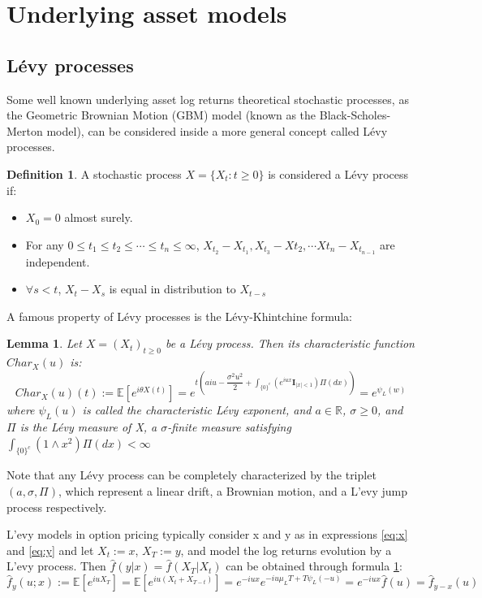 \documentclass[12,twoside]{mammeTFM}
\newtheorem{lem}[thm]{Lemma}
\theoremstyle{definition}
\newtheorem{definition}[thm]{Definition}
\theoremstyle{remark}
\newcommand{\E}{\ensuremath{\mathbb{E}}}
\newcommand{\R}{\ensuremath{\mathbb{R}}}
\begin{document}
\section{Underlying asset models}
\subsection{L\'evy processes}\label{chapter:levy}
Some well known underlying asset log returns theoretical stochastic processes, as the Geometric Brownian Motion (GBM) model (known as the Black-Scholes-Merton\cite{bs73, mer73} model), can be considered inside a more general concept called L\'evy processes.

\begin{definition} A stochastic process $X = \{X_t : t \geq 0\}$ is considered a L\'evy process if:
\begin{itemize}
\item $X_0 = 0$ almost surely.
\item For any $0 \leq t_1 \leq t_2 \leq \cdots \leq t_n \leq \infty$, $X_{t_2} - X_{t_1}, X_{t_3} - X{t_2}, \cdots X{t_n} - X_{t_{n-1}}$ are independent.
\item $\forall s < t$, $X_t - X_s$ is equal in distribution to $X_{t-s}$
\end{itemize}
\end{definition}

A famous property of L\'evy processes is the L\'evy-Khintchine formula:
\begin{lem}\label{levy_khin} Let $X = (X_t)_{t\geq 0}$ be a L\'evy process. Then its characteristic function $Char_X(u)$ is:
$$
Char_X(u)(t) := \E \left[e^{i\theta X(t)}\right] = e^{t\left(aiu - \dfrac{\sigma^2 u^2}{2} + \int_{\{0\}^c}(e^{iu x} \textbf{I}_{|x| < 1})\Pi(dx)\right)} = e^{\psi_L(w)}
$$
where $\psi_L(u)$ is called the characteristic L\'evy exponent, and $a \in \R$, $\sigma \geq 0$, and $\Pi$ is the L\'evy measure of X, a $\sigma$-finite measure satisfying $\int_{\{0\} ^c}(1 \wedge x^2)\Pi (dx) < \infty$
\end{lem}

Note that any L\'evy process can be completely characterized by the triplet $(a, \sigma, \Pi)$, which represent a linear drift, a Brownian motion, and a L'evy jump process respectively.

L'evy models in option pricing typically consider x and y as in expressions \ref{eq:x} and \ref{eq:y} and let $X_t := x$, $X_T := y$, and model the log returns evolution by a L'evy process. Then $\hat{f}(y|x) = \hat{f}(X_T|X_t)$ can be obtained through formula \ref{levy_khin}:
\begin{equation}\label{eq:levy_char}
\hat{f}_{y}(u; x) := 
\E\left[e^{iu X_T}\right] = 
\E\left[e^{iu (X_t + X_{T-t})}\right] = 
e^{-iu x}e^{-i u \mu_L T + T \psi_L(-u)} = 
e^{-iu x}\hat{f}(u) = 
\hat{f}_{y - x}(u)
\end{equation}
\end{document}

